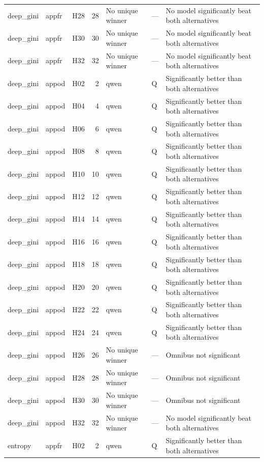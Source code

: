 \begin{longtable}{lllrlll}
deep\_gini & appfr & H28 & 28 & No unique winner & — & No model significantly beat both alternatives \\
deep\_gini & appfr & H30 & 30 & No unique winner & — & No model significantly beat both alternatives \\
deep\_gini & appfr & H32 & 32 & No unique winner & — & No model significantly beat both alternatives \\
deep\_gini & appod & H02 & 2 & qwen & Q & Significantly better than both alternatives \\
deep\_gini & appod & H04 & 4 & qwen & Q & Significantly better than both alternatives \\
deep\_gini & appod & H06 & 6 & qwen & Q & Significantly better than both alternatives \\
deep\_gini & appod & H08 & 8 & qwen & Q & Significantly better than both alternatives \\
deep\_gini & appod & H10 & 10 & qwen & Q & Significantly better than both alternatives \\
deep\_gini & appod & H12 & 12 & qwen & Q & Significantly better than both alternatives \\
deep\_gini & appod & H14 & 14 & qwen & Q & Significantly better than both alternatives \\
deep\_gini & appod & H16 & 16 & qwen & Q & Significantly better than both alternatives \\
deep\_gini & appod & H18 & 18 & qwen & Q & Significantly better than both alternatives \\
deep\_gini & appod & H20 & 20 & qwen & Q & Significantly better than both alternatives \\
deep\_gini & appod & H22 & 22 & qwen & Q & Significantly better than both alternatives \\
deep\_gini & appod & H24 & 24 & qwen & Q & Significantly better than both alternatives \\
deep\_gini & appod & H26 & 26 & No unique winner & — & Omnibus not significant \\
deep\_gini & appod & H28 & 28 & No unique winner & — & Omnibus not significant \\
deep\_gini & appod & H30 & 30 & No unique winner & — & Omnibus not significant \\
deep\_gini & appod & H32 & 32 & No unique winner & — & No model significantly beat both alternatives \\
entropy & appfr & H02 & 2 & qwen & Q & Significantly better than both alternatives \\

\end{longtable}
